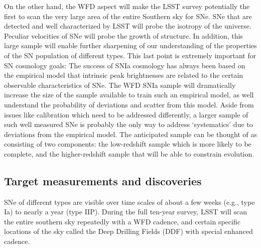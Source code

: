 On the other hand, the WFD aspect will make the LSST survey potentially the 
first to scan the very large area of the entire Southern sky for SNe. 
SNe that are detected and well characterized by LSST will
probe the isotropy of the universe.  Peculiar velocities of 
SNe will probe the growth of structure.  In addition, this large sample
will enable further
sharpening of our understanding of the properties of the SN population 
of different types. 
This last point is extremely important for SN cosmology goals:  The success of SNIa cosmology has always been based on the empirical model that intrinsic peak brightnesses are related to the certain observable characteristics of SNe. 
The 
WFD SNIa sample will dramatically increase the size of the sample 
available to train such an empirical model, as well understand the probability of deviations and scatter from this model. Aside from issues like calibration 
which need to be addressed differently, a larger sample of such well measured SNe is probably the only way to address `systematics' due to deviations from the empirical
model. The anticipated sample can be thought of as consisting of two 
components:  the low-redshift sample which is more likely to be complete, and the higher-redshift sample that will be able to constrain evolution. 

\subsection{Target measurements and discoveries}
\label{sec:keyword:targets}


SNe of different types are visible over time scales of about a few 
weeks (e.g., type Ia) to nearly a year (type IIP).  During the full ten-year
 survey, LSST will scan the entire southern sky repeatedly
 with a WFD cadence, and certain specific locations
of the sky called the Deep Drilling Fields (DDF) with special enhanced cadence. 

